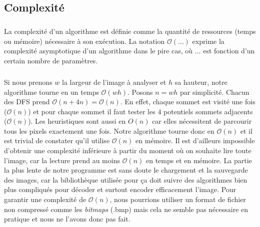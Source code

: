 \subsection{Complexité}
\subparagraph{}
La complexité d'un algorithme est définie comme la quantité de ressources (temps ou mémoire) nécessaire à son exécution. La notation $\mathcal O(\ldots)$ exprime la complexité asymptotique d'un algorithme dans le pire cas, où $\ldots$ est fonction d'un certain nombre de paramètres.

\subparagraph{}
Si nous prenons $w$ la largeur de l'image à analyser et $h$ sa hauteur, notre algorithme tourne en un temps $\mathcal O(wh)$. Posons $n = wh$ par simplicité. Chacun des DFS prend $\mathcal O(n + 4n) = \mathcal O(n)$. En effet, chaque sommet est visité une fois ($\mathcal O(n)$) et pour chaque sommet il faut tester les $4$ potentiels sommets adjacents ($\mathcal O(n)$). Les heuristiques sont aussi en $O(n)$ car elles nécessitent de parcourir tous les pixels exactement une fois. Notre algorithme tourne donc en $\mathcal O(n)$ et il est trivial de constater qu'il utilise $\mathcal O(n)$ en mémoire. Il est d'ailleurs impossible d'obtenir une complexité inférieure à partir du moment où on souhaite lire toute l'image, car la lecture prend au moins $\mathcal O(n)$ en temps et en mémoire. La partie la plus lente de notre programme est sans doute le chargement et la sauvegarde des images, car la bibliothèque utilisée pour ça doit suivre des algorithmes bien plus compliqués pour décoder et surtout encoder efficacement l'image. Pour garantir une complexité de $\mathcal O(n)$, nous pourrions utiliser un format de fichier non compressé comme les \textit{bitmaps} (.bmp) mais cela ne semble pas nécessaire en pratique et nous ne l'avons donc pas fait.